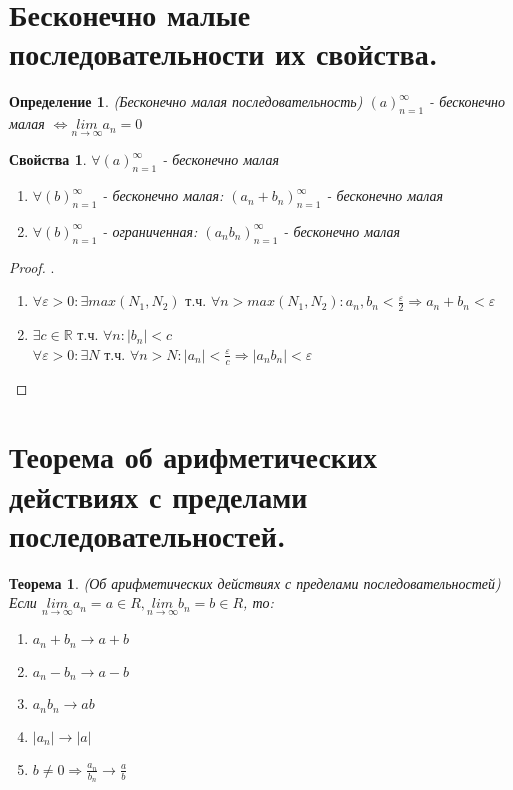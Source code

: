 \documentclass[11pt,a4paper,titlepage]{article}
\newtheorem*{theorem}{Теорема}
\newtheorem*{definition}{Определение}
\newtheorem*{properties}{Свойства}
\renewcommand{\lim}[2]{\underset{#1 \rightarrow #2}{lim}}
\newcommand{\limn}{\lim{n}{\infty}}
\renewcommand{\implies}{\Rightarrow}
\renewcommand{\iff}{\Leftrightarrow}
\renewcommand{\epsilon}{\varepsilon}
\newcommand{\R}{\mathbb{R}}
\begin{document}
    \section{Бесконечно малые последовательности их свойства.}

    \begin{definition}
        (Бесконечно малая последовательность)
        $(a)_{n=1}^\infty$ - бесконечно малая $\iff \limn a_n = 0$
    \end{definition}

    \begin{properties}
        $\forall (a)_{n=1}^\infty$ - бесконечно малая
        \begin{enumerate}
            \item $\forall(b)_{n=1}^\infty$ - бесконечно малая: $(a_n + b_n)_{n=1}^\infty$ - бесконечно малая
            \item $\forall(b)_{n=1}^\infty$ - ограниченная: $(a_n b_n)_{n=1}^\infty$ - бесконечно малая
        \end{enumerate}
    \end{properties}

    \begin{proof}
        .\\
        \begin{enumerate}
            \item $\forall \epsilon > 0: \exists max(N_1, N_2)$ т.ч. $\forall n > max(N_1, N_2): a_n, b_n < \frac{\epsilon}{2} \implies a_n+b_n<\epsilon$
            \item $\exists c \in \R$ т.ч. $\forall n: |b_n|<c$\\
            $\forall \epsilon > 0: \exists N$ т.ч. $\forall n > N: |a_n| < \frac{\epsilon}{c} \implies |a_n b_n| < \epsilon$
        \end{enumerate}
    \end{proof}


    \section{Теорема об арифметических действиях с пределами последовательностей.}

    \begin{theorem}
        (Об арифметических действиях с пределами последовательностей)
        Если $\limn a_n = a \in R, \limn b_n = b \in R$, то:
        \begin{enumerate}
            \item $a_n+b_n \to a+b$
            \item $a_n-b_n \to a-b$
            \item $a_n b_n \to ab$
            \item $|a_n| \to |a|$
            \item $b \neq 0 \implies \frac{a_n}{b_n} \to \frac{a}{b}$
        \end{enumerate}
    \end{theorem}
\end{document}
